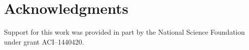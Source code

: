 




\section*{Acknowledgments}

Support for this work was provided in part by the National Science Foundation under grant
ACI--1440420.


